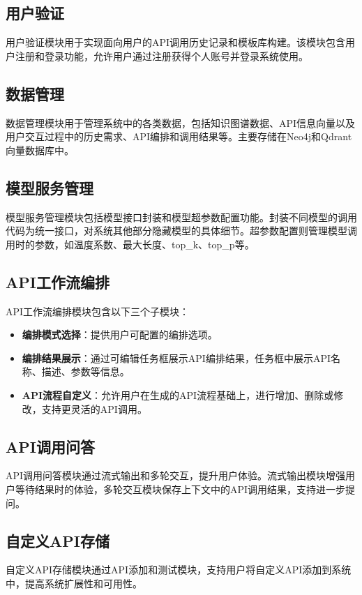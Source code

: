 \subsection{用户验证}
用户验证模块用于实现面向用户的API调用历史记录和模板库构建。该模块包含用户注册和登录功能，允许用户通过注册获得个人账号并登录系统使用。

\subsection{数据管理}
数据管理模块用于管理系统中的各类数据，包括知识图谱数据、API信息向量以及用户交互过程中的历史需求、API编排和调用结果等。主要存储在Neo4j和Qdrant向量数据库中。

\subsection{模型服务管理}
模型服务管理模块包括模型接口封装和模型超参数配置功能。封装不同模型的调用代码为统一接口，对系统其他部分隐藏模型的具体细节。超参数配置则管理模型调用时的参数，如温度系数、最大长度、top\_k、top\_p等。

\subsection{API工作流编排}
API工作流编排模块包含以下三个子模块：
\begin{itemize}
    \item \textbf{编排模式选择}：提供用户可配置的编排选项。
    \item \textbf{编排结果展示}：通过可编辑任务框展示API编排结果，任务框中展示API名称、描述、参数等信息。
    \item \textbf{API流程自定义}：允许用户在生成的API流程基础上，进行增加、删除或修改，支持更灵活的API调用。
\end{itemize}

\subsection{API调用问答}

API调用问答模块通过流式输出和多轮交互，提升用户体验。流式输出模块增强用户等待结果时的体验，多轮交互模块保存上下文中的API调用结果，支持进一步提问。

\subsection{自定义API存储}
自定义API存储模块通过API添加和测试模块，支持用户将自定义API添加到系统中，提高系统扩展性和可用性。

